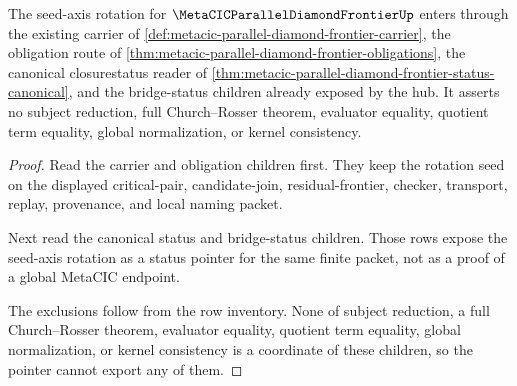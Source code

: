 \begin{theorem}
\label{thm:metacic-parallel-diamond-frontier-rotation-seed-pointer}
The seed-axis rotation for $\MetaCICParallelDiamondFrontierUp$ enters through the existing carrier of \autoref{def:metacic-parallel-diamond-frontier-carrier}, the obligation route of \autoref{thm:metacic-parallel-diamond-frontier-obligations}, the canonical closurestatus reader of \autoref{thm:metacic-parallel-diamond-frontier-status-canonical}, and the bridge-status children already exposed by the hub. It asserts no subject reduction, full Church--Rosser theorem, evaluator equality, quotient term equality, global normalization, or kernel consistency.
\end{theorem}
\begin{proof}
Read the carrier and obligation children first. They keep the rotation seed on the displayed critical-pair, candidate-join, residual-frontier, checker, transport, replay, provenance, and local naming packet.

Next read the canonical status and bridge-status children. Those rows expose the seed-axis rotation as a status pointer for the same finite packet, not as a proof of a global MetaCIC endpoint.

The exclusions follow from the row inventory. None of subject reduction, a full Church--Rosser theorem, evaluator equality, quotient term equality, global normalization, or kernel consistency is a coordinate of these children, so the pointer cannot export any of them.
\end{proof}
